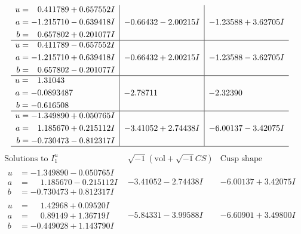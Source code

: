 \documentclass[1p]{elsarticle_modified}
\theoremstyle{definition}
\newcommand{\I}{\sqrt{-1}}
\begin{document}
$$\begin{array}{c|c|c}
\begin{aligned}
u &= \phantom{-}0.411789 + 0.657552 I \\
a &= -1.215710 - 0.639418 I \\
b &= \phantom{-}0.657802 + 0.201077 I\end{aligned}
 & -0.66432 - 2.00215 I & -1.23588 + 3.62705 I \\ \hline\begin{aligned}
u &= \phantom{-}0.411789 - 0.657552 I \\
a &= -1.215710 + 0.639418 I \\
b &= \phantom{-}0.657802 - 0.201077 I\end{aligned}
 & -0.66432 + 2.00215 I & -1.23588 - 3.62705 I \\ \hline\begin{aligned}
u &= \phantom{-}1.31043\phantom{ +0.000000I} \\
a &= -0.0893487\phantom{ +0.000000I} \\
b &= -0.616508\phantom{ +0.000000I}\end{aligned}
 & -2.78711\phantom{ +0.000000I} & -2.32390\phantom{ +0.000000I} \\ \hline\begin{aligned}
u &= -1.349890 + 0.050765 I \\
a &= \phantom{-}1.185670 + 0.215112 I \\
b &= -0.730473 - 0.812317 I\end{aligned}
 & -3.41052 + 2.74438 I & -6.00137 - 3.42075 I\\
 \hline 
 \end{array}$$\newpage$$\begin{array}{c|c|c}  
\text{Solutions to }I^u_{1}& \I (\text{vol} + \sqrt{-1}CS) & \text{Cusp shape}\\
 \hline 
\begin{aligned}
u &= -1.349890 - 0.050765 I \\
a &= \phantom{-}1.185670 - 0.215112 I \\
b &= -0.730473 + 0.812317 I\end{aligned}
 & -3.41052 - 2.74438 I & -6.00137 + 3.42075 I \\ \hline\begin{aligned}
u &= \phantom{-}1.42968 + 0.09520 I \\
a &= \phantom{-}0.89149 + 1.36719 I \\
b &= -0.449028 + 1.143790 I\end{aligned}
 & -5.84331 - 3.99588 I & -6.60901 + 3.49800 I \\ \hline\begin{aligned}

\end{aligned}
\end{array}$$
\end{document}
